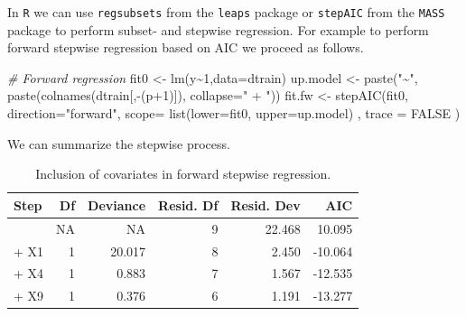 \documentclass[
]{book}
\newenvironment{Shaded}{\begin{snugshade}}{\end{snugshade}}
\newcommand{\AttributeTok}[1]{\textcolor[rgb]{0.77,0.63,0.00}{#1}}
\newcommand{\CommentTok}[1]{\textcolor[rgb]{0.56,0.35,0.01}{\textit{#1}}}
\newcommand{\ConstantTok}[1]{\textcolor[rgb]{0.00,0.00,0.00}{#1}}
\newcommand{\DecValTok}[1]{\textcolor[rgb]{0.00,0.00,0.81}{#1}}
\newcommand{\FunctionTok}[1]{\textcolor[rgb]{0.00,0.00,0.00}{#1}}
\newcommand{\NormalTok}[1]{#1}
\newcommand{\OtherTok}[1]{\textcolor[rgb]{0.56,0.35,0.01}{#1}}
\newcommand{\SpecialCharTok}[1]{\textcolor[rgb]{0.00,0.00,0.00}{#1}}
\newcommand{\StringTok}[1]{\textcolor[rgb]{0.31,0.60,0.02}{#1}}
\begin{document}
In \texttt{R} we can use \texttt{regsubsets} from the \texttt{leaps} package or \texttt{stepAIC} from the \texttt{MASS} package to perform subset- and stepwise regression. For example to perform forward stepwise regression based on AIC we proceed as follows.

\begin{Shaded}
\begin{Highlighting}[]
\CommentTok{\# Forward regression}
\NormalTok{fit0 }\OtherTok{\textless{}{-}} \FunctionTok{lm}\NormalTok{(y}\SpecialCharTok{\textasciitilde{}}\DecValTok{1}\NormalTok{,}\AttributeTok{data=}\NormalTok{dtrain)}
\NormalTok{up.model }\OtherTok{\textless{}{-}} \FunctionTok{paste}\NormalTok{(}\StringTok{"\textasciitilde{}"}\NormalTok{, }\FunctionTok{paste}\NormalTok{(}\FunctionTok{colnames}\NormalTok{(dtrain[,}\SpecialCharTok{{-}}\NormalTok{(p}\SpecialCharTok{+}\DecValTok{1}\NormalTok{)]), }\AttributeTok{collapse=}\StringTok{" + "}\NormalTok{))}
\NormalTok{fit.fw }\OtherTok{\textless{}{-}} \FunctionTok{stepAIC}\NormalTok{(fit0,}
                  \AttributeTok{direction=}\StringTok{"forward"}\NormalTok{,}
                  \AttributeTok{scope=}
                    \FunctionTok{list}\NormalTok{(}\AttributeTok{lower=}\NormalTok{fit0,}
                         \AttributeTok{upper=}\NormalTok{up.model)}
\NormalTok{                    ,}
                  \AttributeTok{trace =} \ConstantTok{FALSE}
\NormalTok{)}
\end{Highlighting}
\end{Shaded}

We can summarize the stepwise process.

\begin{Shaded}
\end{Shaded}

\begin{table}

\caption{\label{tab:unnamed-chunk-23}Inclusion of covariates in forward stepwise regression.}
\centering
\begin{tabular}[t]{lrrrrr}
\toprule
Step & Df & Deviance & Resid. Df & Resid. Dev & AIC\\
\midrule
 & NA & NA & 9 & 22.468 & 10.095\\
+ X1 & 1 & 20.017 & 8 & 2.450 & -10.064\\
+ X4 & 1 & 0.883 & 7 & 1.567 & -12.535\\
+ X9 & 1 & 0.376 & 6 & 1.191 & -13.277\\
\bottomrule
\end{tabular}
\end{table}
\end{document}
